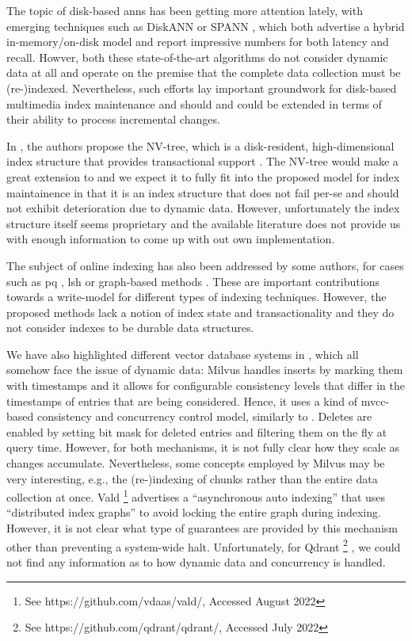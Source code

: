 The topic of disk-based \acrshort{anns} has been getting more attention lately, with emerging techniques such as DiskANN \cite{Jayaram:2019DiskANN} or SPANN \cite{Chen:2021SPANN}, which both advertise a hybrid in-memory/on-disk model and report impressive numbers for both latency and recall. Howver, both these state-of-the-art algorithms do not consider dynamic data at all and operate on the premise that the complete data collection must be (re-)indexed. Nevertheless, such efforts lay important groundwork for disk-based multimedia index maintenance and should and could be extended in terms of their ability to process incremental changes.

In \cite{Lejsek:2011NVTree,Lejsek:2009NVTree}, the authors propose the NV-tree, which is a disk-resident, high-dimensional index structure that provides transactional support \cite{Lejsek:2018Transactional}. The NV-tree would make a great extension to \cottontail{} and we expect it to fully fit into the proposed model for index maintainence in that it is an index structure that does not fail per-se and should not exhibit deterioration due to dynamic data. However, unfortunately the index structure itself seems proprietary and the available literature does not provide us with enough information to come up with out own implementation.

The subject of online indexing has also been addressed by some authors, for cases such as \acrshort{pq} \cite{Xu:2018Online}, \acrshort{lsh} \cite{Cakir:2015Adaptive} or graph-based methods \cite{Zhao:2022Approximate}. These are important contributions towards a write-model for different types of indexing techniques. However, the proposed methods lack a notion of index state and transactionality and they do not consider indexes to be durable data structures.

We have also highlighted different vector database systems in , which all somehow face the issue of dynamic data: Milvus \cite{Wang:2021Milvus} handles inserts by marking them with timestamps and it allows for configurable consistency levels that differ in the timestamps of entries that are being considered. Hence, it uses a kind of \acrshort{mvcc}-based consistency and concurrency control model, similarly to \cottontail. Deletes are enabled by setting bit mask for deleted entries and filtering them on the fly at query time. However, for both mechanisms, it is not fully clear how they scale as changes accumulate. Nevertheless, some concepts employed by Milvus may be very interesting, e.g., the (re-)indexing of chunks rather than the entire data collection at once. Vald \footnote{See https://github.com/vdaas/vald/, Accessed August 2022} advertises a ``asynchronous auto indexing'' that uses ``distributed index graphs'' to avoid locking the entire graph during indexing. However, it is not clear what type of guarantees are provided by this mechanism other than preventing a system-wide halt. Unfortunately, for Qdrant \footnote{See https://github.com/qdrant/qdrant/, Accessed July 2022} , we could not find any information as to how dynamic data and concurrency is handled.

